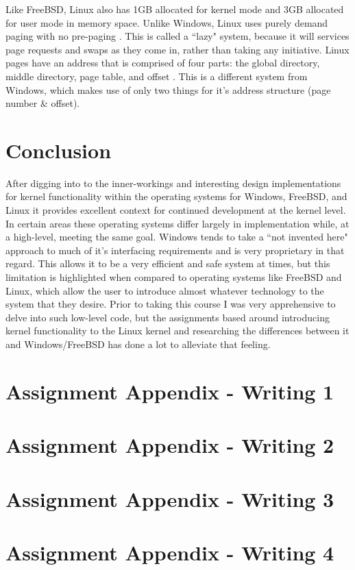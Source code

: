 \documentclass[10pt,draftclsnofoot,onecolumn]{IEEEtran}
\begin{document}
\par Like FreeBSD, Linux also has 1GB allocated for kernel mode and 3GB allocated for user mode in memory space.
Unlike Windows, Linux uses purely demand paging with no pre-paging \cite{linux:1}.
This is called a ``lazy" system, because it will services page requests and swaps as they come in, rather than taking any initiative.
Linux pages have an address that is comprised of four parts: the global directory, middle directory, page table, and offset \cite{linux:1}.
This is a different system from Windows, which makes use of only two things for it's address structure (page number \& offset).

\section{Conclusion}
\par After digging into to the inner-workings and interesting design implementations for kernel functionality within the operating systems for Windows, FreeBSD, and Linux it provides excellent context for continued development at the kernel level.
In certain areas these operating systems differ largely in implementation while, at a high-level, meeting the same goal.
Windows tends to take a ``not invented here" approach to much of it's interfacing requirements and is very proprietary in that regard.
This allows it to be a very efficient and safe system at times, but this limitation is highlighted when compared to operating systems like FreeBSD and Linux, which allow the user to introduce almost whatever technology to the system that they desire.
Prior to taking this course I was very apprehensive to delve into such low-level code, but the assignments based around introducing kernel functionality to the Linux kernel and researching the differences between it and Windows/FreeBSD has done a lot to alleviate that feeling.

\section{Assignment Appendix - Writing 1}


\section{Assignment Appendix - Writing 2}


\section{Assignment Appendix - Writing 3}


\section{Assignment Appendix - Writing 4}




\end{document}
